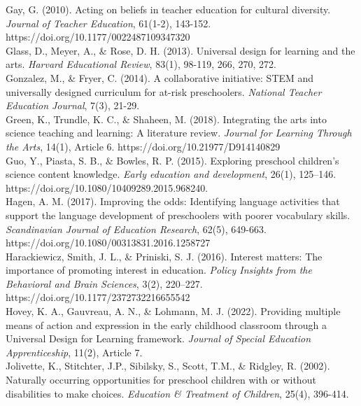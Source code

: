 \documentclass[11.5pt]{sig-alternate}
\begin{document}
Gay, G. (2010). Acting on beliefs in teacher education for cultural diversity. \textit{Journal of 
Teacher Education}, 61(1-2), 143-152. https://doi.org/10.1177/0022487109347320 
\\

Glass, D., Meyer, A., \& Rose, D. H. (2013). Universal design for learning and the arts. \textit{Harvard 
Educational Review}, 83(1), 98-119, 266, 270, 272.
\\

Gonzalez, M., \& Fryer, C. (2014). A collaborative initiative: STEM and universally designed 
curriculum for at-risk preschoolers.\textit{ National Teacher Education Journal}, 7(3), 21-29. 
\\

Green, K., Trundle, K. C., \& Shaheen, M. (2018). Integrating the arts into science teaching and 
learning: A literature review. \textit{Journal for Learning Through the Arts}, 14(1), Article 6. https://doi.org/10.21977/D914140829 
\\

Guo, Y., Piasta, S. B., \& Bowles, R. P. (2015). Exploring preschool children's science content 
knowledge. \textit{Early education and development}, 26(1), 125–146.\\ https://doi.org/10.1080/10409289.2015.968240. 
\\

Hagen, A. M. (2017). Improving the odds: Identifying language activities that support the 
language development of preschoolers with poorer vocabulary skills. \textit{Scandinavian Journal of Education Research}, 62(5), 649-663. https://doi.org/10.1080/00313831.2016.1258727 
\\

Harackiewicz, Smith, J. L., \& Priniski, S. J. (2016). Interest matters: The importance of 
promoting interest in education. \textit{Policy Insights from the Behavioral and Brain Sciences}, 3(2), 220–227. \\https://doi.org/10.1177/2372732216655542 
\\

Hovey, K. A., Gauvreau, A. N., \& Lohmann, M. J. (2022). Providing multiple means of 
action and expression in the early childhood classroom through a Universal Design for Learning framework. \textit{Journal of Special Education Apprenticeship}, 11(2), Article 7.
\\

Jolivette, K., Stitchter, J.P., Sibilsky, S., Scott, T.M., \& Ridgley, R. (2002). Naturally occurring
opportunities for preschool children with or without disabilities to make choices. \textit{Education \& Treatment of Children}, 25(4), 396-414.
\\
\end{document}
